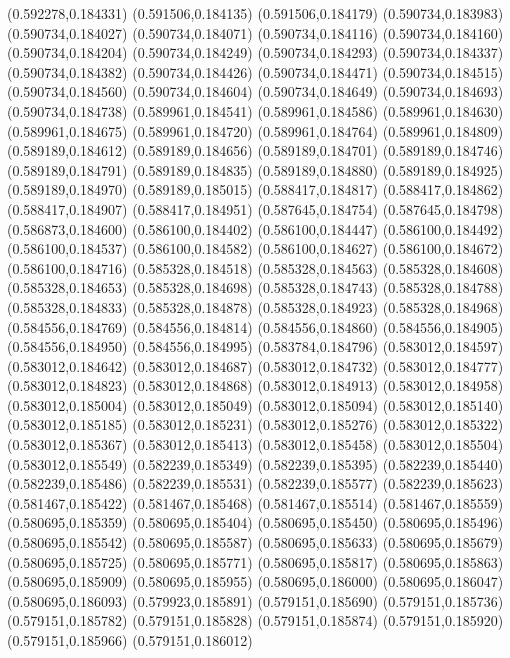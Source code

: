 (0.592278,0.184331)
(0.591506,0.184135)
(0.591506,0.184179)
(0.590734,0.183983)
(0.590734,0.184027)
(0.590734,0.184071)
(0.590734,0.184116)
(0.590734,0.184160)
(0.590734,0.184204)
(0.590734,0.184249)
(0.590734,0.184293)
(0.590734,0.184337)
(0.590734,0.184382)
(0.590734,0.184426)
(0.590734,0.184471)
(0.590734,0.184515)
(0.590734,0.184560)
(0.590734,0.184604)
(0.590734,0.184649)
(0.590734,0.184693)
(0.590734,0.184738)
(0.589961,0.184541)
(0.589961,0.184586)
(0.589961,0.184630)
(0.589961,0.184675)
(0.589961,0.184720)
(0.589961,0.184764)
(0.589961,0.184809)
(0.589189,0.184612)
(0.589189,0.184656)
(0.589189,0.184701)
(0.589189,0.184746)
(0.589189,0.184791)
(0.589189,0.184835)
(0.589189,0.184880)
(0.589189,0.184925)
(0.589189,0.184970)
(0.589189,0.185015)
(0.588417,0.184817)
(0.588417,0.184862)
(0.588417,0.184907)
(0.588417,0.184951)
(0.587645,0.184754)
(0.587645,0.184798)
(0.586873,0.184600)
(0.586100,0.184402)
(0.586100,0.184447)
(0.586100,0.184492)
(0.586100,0.184537)
(0.586100,0.184582)
(0.586100,0.184627)
(0.586100,0.184672)
(0.586100,0.184716)
(0.585328,0.184518)
(0.585328,0.184563)
(0.585328,0.184608)
(0.585328,0.184653)
(0.585328,0.184698)
(0.585328,0.184743)
(0.585328,0.184788)
(0.585328,0.184833)
(0.585328,0.184878)
(0.585328,0.184923)
(0.585328,0.184968)
(0.584556,0.184769)
(0.584556,0.184814)
(0.584556,0.184860)
(0.584556,0.184905)
(0.584556,0.184950)
(0.584556,0.184995)
(0.583784,0.184796)
(0.583012,0.184597)
(0.583012,0.184642)
(0.583012,0.184687)
(0.583012,0.184732)
(0.583012,0.184777)
(0.583012,0.184823)
(0.583012,0.184868)
(0.583012,0.184913)
(0.583012,0.184958)
(0.583012,0.185004)
(0.583012,0.185049)
(0.583012,0.185094)
(0.583012,0.185140)
(0.583012,0.185185)
(0.583012,0.185231)
(0.583012,0.185276)
(0.583012,0.185322)
(0.583012,0.185367)
(0.583012,0.185413)
(0.583012,0.185458)
(0.583012,0.185504)
(0.583012,0.185549)
(0.582239,0.185349)
(0.582239,0.185395)
(0.582239,0.185440)
(0.582239,0.185486)
(0.582239,0.185531)
(0.582239,0.185577)
(0.582239,0.185623)
(0.581467,0.185422)
(0.581467,0.185468)
(0.581467,0.185514)
(0.581467,0.185559)
(0.580695,0.185359)
(0.580695,0.185404)
(0.580695,0.185450)
(0.580695,0.185496)
(0.580695,0.185542)
(0.580695,0.185587)
(0.580695,0.185633)
(0.580695,0.185679)
(0.580695,0.185725)
(0.580695,0.185771)
(0.580695,0.185817)
(0.580695,0.185863)
(0.580695,0.185909)
(0.580695,0.185955)
(0.580695,0.186000)
(0.580695,0.186047)
(0.580695,0.186093)
(0.579923,0.185891)
(0.579151,0.185690)
(0.579151,0.185736)
(0.579151,0.185782)
(0.579151,0.185828)
(0.579151,0.185874)
(0.579151,0.185920)
(0.579151,0.185966)
(0.579151,0.186012)
